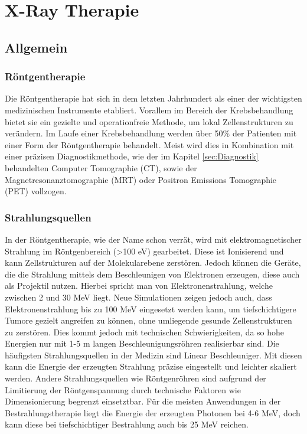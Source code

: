 \newpage
\section{X-Ray Therapie}

\subsection{Allgemein}


\subsubsection{Röntgentherapie}
Die Röntgentherapie hat sich in dem letzten Jahrhundert als einer der wichtigsten medizinischen Instrumente etabliert.
Vorallem im Bereich der Krebsbehandlung bietet sie ein gezielte und operationfreie Methode, um lokal Zellenstrukturen zu verändern.
Im Laufe einer Krebsbehandlung werden über 50\% der Patienten mit einer Form der Röntgentherapie behandelt.
Meist wird dies in Kombination mit einer präzisen Diagnostikmethode, wie der im Kapitel \ref{sec:Diagnostik} behandelten Computer Tomographie (CT), sowie
der Magnetresonanztomographie (MRT) oder Positron Emissions Tomographie (PET) vollzogen. \cite{hoskin2019external}
\subsubsection{Strahlungsquellen}
In der Röntgentherapie, wie der Name schon verrät, wird mit elektromagnetischer Strahlung im Röntgenbereich (>100 eV) gearbeitet. 
Diese ist Ionisierend und kann Zellstrukturen auf der Molekularebene zerstören.
Jedoch können die Geräte, die die Strahlung mittels dem Beschleunigen von Elektronen erzeugen, diese auch als Projektil nutzen.
Hierbei spricht man von Elektronenstrahlung, welche zwischen 2 und 30 MeV liegt.
Neue Simulationen zeigen jedoch auch, dass Elektronenstrahlung bis zu 100 MeV eingesetzt werden kann, um tiefschichtigere Tumore gezielt angreifen zu können, ohne umliegende gesunde Zellenstrukturen zu zerstören.
Dies kommt jedoch mit technischen Schwierigkeiten, da so hohe Energien nur mit 1-5 m langen Beschleunigungsröhren realisierbar sind. \cite{shady_author}
Die häufigsten Strahlungsquellen in der Medizin sind Linear Beschleuniger.
Mit diesen kann die Energie der erzeugten Strahlung präzise eingestellt und leichter skaliert werden.
Andere Strahlungsquellen wie Röntgenröhren sind aufgrund der Limitierung der Röntgenspannung durch technische Faktoren wie Dimensionierung begrenzt einsetztbar.
Für die meisten Anwendungen in der Bestrahlungstherapie liegt die Energie der erzeugten Photonen bei 4-6 MeV, doch kann diese bei tiefschichtiger Bestrahlung auch bis 25 MeV reichen. \cite{KriegerHannoSfTu}









